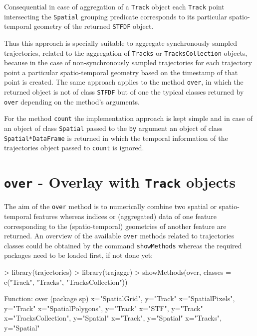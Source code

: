 \documentclass[12pt, oneside, a4paper]{scrbook}
\newcommand{\pkg}[1]{{\normalfont\fontseries{b}\selectfont #1}}
\let\code=\texttt
\newcommand{\codeintitles}[1]{{\tt #1}} %
\begin{document}
Consequential in case of aggregation of a \code{Track} object each \code{Track} point intersecting the \code{Spatial} grouping predicate corresponds to its particular spatio-temporal geometry of the returned \code{STFDF} object. 
\par\medskip
Thus this approach is specially suitable to aggregate synchronously sampled trajectories, related to the aggregation of \code{Tracks} or \code{TracksCollection} objects, because in the case of non-synchronously sampled trajectories for each trajectory point a particular spatio-temporal geometry based on the timestamp of that point is created.
The same approach applies to the method \code{over}, in which the returned object is not of class \code{STFDF} but of one the typical classes returned by \code{over} depending on the method's arguments.
\par\medskip
For the method \code{count} the implementation approach is kept simple and in case of an object of class \code{Spatial} passed to the \code{by} argument an object of class \code{Spatial*DataFrame} is returned in which the temporal information of the \pkg{trajectories} object passed to \code{count} is ignored.
\par\medskip



\section{\codeintitles{over} - Overlay with \codeintitles{Track} objects}
\label{sec:overlaywithtrackobjects}

The aim of the \code{over} method is to numerically combine two spatial or spatio-temporal features whereas indices or (aggregated) data of one feature corresponding to the (spatio-temporal) geometries of another feature are returned.
An overview of the available \code{over} methods related to \pkg{trajectories} classes could be obtained by the command \code{showMethods} whereas the required packages need to be loaded first, if not done yet:
\par\medskip

\begin{small}
\begin{Schunk}
\begin{Sinput}
> library(trajectories)
> library(trajaggr)
> showMethods(over, classes = c("Track", "Tracks", "TracksCollection"))
\end{Sinput}
\begin{Soutput}
Function: over (package sp)
x="SpatialGrid", y="Track"
x="SpatialPixels", y="Track"
x="SpatialPolygons", y="Track"
x="STF", y="Track"
x="TracksCollection", y="Spatial"
x="Track", y="Spatial"
x="Tracks", y="Spatial"
\end{Soutput}
\end{Schunk}
\end{small}
\end{document}
